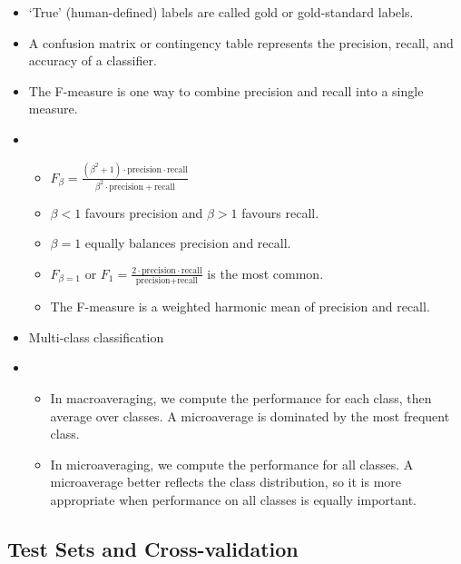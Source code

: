 \begin{itemize}
  \item `True' (human-defined) labels are called gold or gold-standard labels.
  \item A confusion matrix or contingency table represents the precision, recall, and accuracy of a classifier.
  \item The F-measure is one way to combine precision and recall into a single measure.
  \item[]
        \begin{itemize}
          \item $F_{\beta} = \frac{(\beta^2 + 1) \cdot \text{precision} \cdot \text{recall}}{\beta^2 \cdot \text{precision} + \text{recall}}$
          \item $\beta < 1$ favours precision and $\beta > 1$ favours recall.
          \item $\beta = 1$ equally balances precision and recall.
          \item $F_{\beta = 1}$ or $F_1 = \frac{2 \cdot \text{precision} \cdot \text{recall}}{\text{precision} + \text{recall}}$ is the most common.
          \item The F-measure is a weighted harmonic mean of precision and recall.
        \end{itemize}
  \item Multi-class classification
  \item[]
        \begin{itemize}
          \item In macroaveraging, we compute the performance for each class, then average over classes.
                A microaverage is dominated by the most frequent class.
          \item In microaveraging, we compute the performance for all classes.
                A microaverage better reflects the class distribution, so it is more
                appropriate when performance on all classes is equally important.
        \end{itemize}
\end{itemize}

\subsection{Test Sets and Cross-validation}

